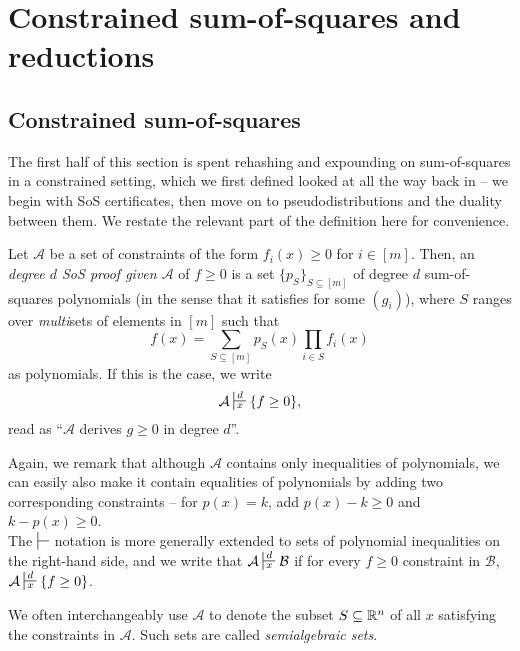 
\clearpage

\section{Constrained sum-of-squares and reductions}
\label{sec:constrained}

\subsection{Constrained sum-of-squares}

The first half of this section is spent rehashing and expounding on sum-of-squares in a constrained setting, which we first defined looked at all the way back in  -- we begin with SoS certificates, then move on to pseudodistributions and the duality between them. We restate the relevant part of the definition here for convenience.

\begin{fdef}
	Let $\mathcal{A}$ be a set of constraints of the form $f_i(x) \ge 0$ for $i \in [m]$. Then, an \emph{degree $d$ SoS proof given $\mathcal{A}$} of $f \ge 0$ is a set $\{p_S\}_{S \subseteq [m]}$ of degree $d$ sum-of-squares polynomials (in the sense that it satisfies  for some $(g_i)$), where $S$ ranges over \emph{multi}sets of elements in $[m]$ such that
	\[ f(x) = \sum_{S \subseteq [m]} p_S(x) \prod_{i \in S} f_i(x) \]
	as polynomials. If this is the case, we write
	\[ \mathcal{A} \sststile{x}{d} \{f \ge 0\}, \]
	read as ``$\mathcal{A}$ derives $g \ge 0$ in degree $d$''.
\end{fdef}
Again, we remark that although $\mathcal{A}$ contains only inequalities of polynomials, we can easily also make it contain equalities of polynomials by adding two corresponding constraints -- for $p(x) = k$, add $p(x)-k \ge 0$ and $k-p(x) \ge 0$. \\
The $\sststile{}{}$ notation is more generally extended to sets of polynomial inequalities on the right-hand side, and we write that $\mathcal{A} \sststile{x}{d} \mathcal{B}$ if for every $f \ge 0$ constraint in $\mathcal{B}$, $\mathcal{A} \sststile{x}{d} \{f \ge 0\}$.

We often interchangeably use $\mathcal{A}$ to denote the subset $S \subseteq \mathbb{R}^n$ of all $x$ satisfying the constraints in $\mathcal{A}$. Such sets are called \emph{semialgebraic sets}.\\

